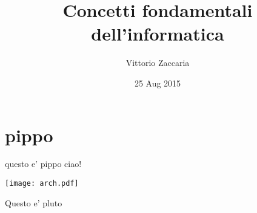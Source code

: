 \documentclass[smaller]{beamer}
\author{Vittorio Zaccaria}
\date{25 Aug 2015}
\title{Concetti fondamentali dell'informatica}
\begin{document}
\maketitle


\section{pippo}
\label{sec-1}

\begin{frame}[label=sec-1-1]{questo e' pippo}
ciao!

\texttt{[image: arch.pdf]}
\end{frame}

\begin{frame}[label=sec-1-2]{Questo e' pluto}
\end{frame}
\end{document}
